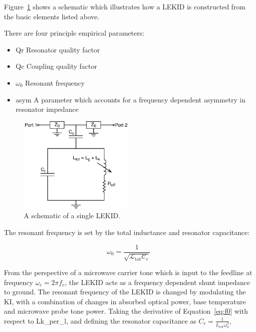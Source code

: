 Figure~\ref{fig:lekid_schematic} shows a schematic which illustrates how a LEKID is constructed from the basic elements listed above.

There are four principle empirical parameters:

\begin{itemize}[label={},nosep]
  \item \gls{Qr} \quad Resonator quality factor
  \item \gls{Qc} \quad Coupling quality factor
  \item $\omega_{0}$ \quad Resonant frequency
  \item \gls{asym} \quad A parameter which accounts for a frequency dependent asymmetry in resonator impedance
\end{itemize}

\begin{figure}[!htbp]
\centering
\includegraphics[width=0.5\textwidth]{figures/kid_model/mkid_schematic}
\caption{A schematic of a single LEKID.}
\label{fig:lekid_schematic}
\end{figure}

The resonant frequency is set by the total inductance and resonator capacitance:

\begin{equation}\label{eq:f0}
  \omega_{0} = \frac{1}{\sqrt{\mathcal{L}_{\mathrm{tot}}\mathcal{C}_{r}}}
\end{equation}

From the perspective of a microwave carrier tone which is input to the feedline at frequency $\omega_{c} = 2\pi f_{c}$, the LEKID acts as a frequency dependent shunt impedance to ground. The resonant frequency of the LEKID is changed by modulating the KI, with a combination of changes in absorbed optical power, base temperature and microwave probe tone power. Taking the derivative of Equation~\ref{eq:f0} with respect to \gls{Lk_per_l}, and defining the resonator capacitance as $C_{r} = \frac{1}{L_{\mathrm{tot}}\omega_{0}^{2}}$,

